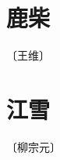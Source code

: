 \documentclass[12pt,UTF-8,openany]{ctexbook}
\begin{document}
\vspace{8pt}


\section{鹿柴}

\begin{center}
    \vspace{10pt}
    
    \begin{normalsize}
        
        〔王维〕
        
    \end{normalsize}
    
    \vspace{8pt}
    
    \begin{large}
        
        
        
    \end{large}
    
\end{center}

\vspace{8pt}


\section{江雪}

\begin{center}
    \vspace{10pt}
    
    \begin{normalsize}
        
        〔柳宗元〕
        
    \end{normalsize}
    
    \vspace{8pt}
    
    \begin{large}
        
        
        
    \end{large}
    
\end{center}
\end{document}
